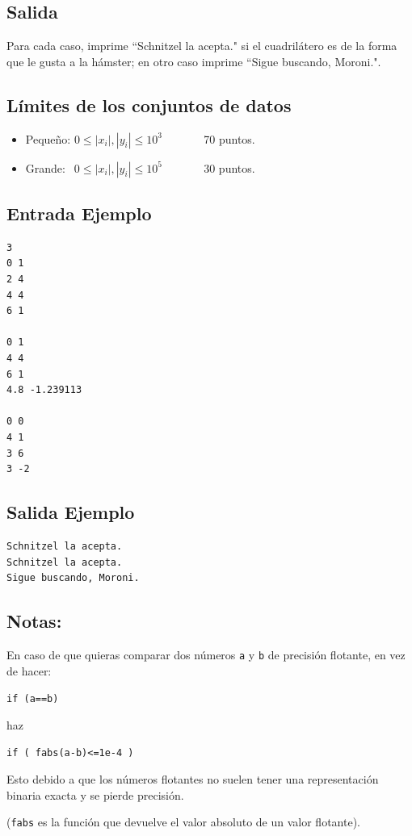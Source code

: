 \subsection*{Salida}

Para cada caso, imprime ``Schnitzel la acepta." si el cuadrilátero es de la forma que le gusta a la hámster; en otro caso imprime ``Sigue buscando, Moroni.".


\subsection*{Límites de los conjuntos de datos}

\begin{itemize}
\item Pequeño: $0 \leq |x_i|, |y_i| \leq 10^3$  $\quad \quad \quad$ 70 puntos.
\item Grande: $\,\;0 \leq |x_i|, |y_i| \leq 10^5$ $\quad \quad \quad$ 30 puntos.
\end{itemize}
\newpage

\begin{multicols}{2}

\subsection*{Entrada Ejemplo}
\begin{verbatim}
3
0 1
2 4
4 4
6 1

0 1
4 4
6 1
4.8 -1.239113

0 0
4 1
3 6
3 -2
\end{verbatim}
\columnbreak

\subsection*{Salida Ejemplo}
\begin{verbatim}
Schnitzel la acepta.
Schnitzel la acepta.
Sigue buscando, Moroni.
\end{verbatim}
\end{multicols}

\subsection*{Notas:}
En caso de que quieras comparar dos números \texttt{a} y \texttt{b} de precisión flotante, en vez de hacer:

\texttt{if (a==b)} 

haz 

\texttt{if ( fabs(a-b)<=1e-4 )}

Esto debido a que los números flotantes no suelen tener una representación binaria exacta y se pierde precisión.

(\texttt{fabs} es la función que devuelve el valor absoluto de un valor flotante).